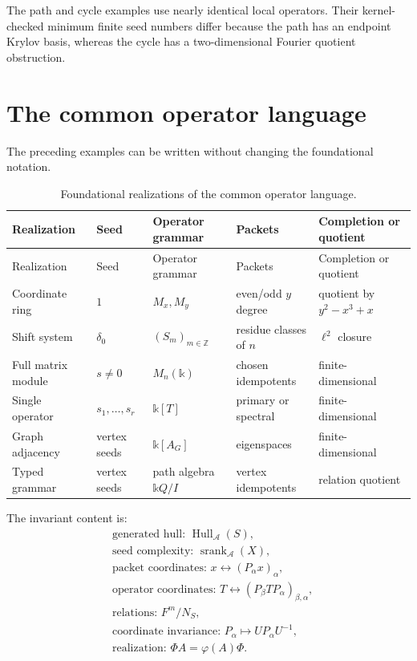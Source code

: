 \documentclass[11pt]{article}
\theoremstyle{definition}
\theoremstyle{remark}
\newcommand{\cA}{\mathcal A}
\newcommand{\Hull}{\operatorname{Hull}}
\newcommand{\srank}{\operatorname{srank}}
\newcommand{\bbk}{\mathbb{k}}
\newcommand{\Z}{\mathbb Z}
\begin{document}
The path and cycle examples use nearly identical local operators.  Their
kernel-checked minimum finite seed numbers differ because the path has an
endpoint Krylov basis, whereas the cycle has a two-dimensional Fourier
quotient obstruction.

\section{The common operator language}

The preceding examples can be written without changing the foundational notation.

\begin{longtable}{L{0.12\textwidth}L{0.13\textwidth}L{0.19\textwidth}L{0.17\textwidth}L{0.16\textwidth}}
\caption{Foundational realizations of the common operator language.}\label{tab:dictionary}\\
\toprule
Realization & Seed & Operator grammar & Packets & Completion or quotient \\
\midrule
\endfirsthead
\toprule
Realization & Seed & Operator grammar & Packets & Completion or quotient \\
\midrule
\endhead
Coordinate ring & $1$ & $M_x,M_y$ & even/odd $y$ degree & quotient by $y^2-x^3+x$ \\
Shift system & $\delta_0$ & $(S_m)_{m\in\Z}$ & residue classes of $n$ & $\ell^2$ closure \\
Full matrix module & $s\ne0$ & $M_n(\bbk)$ & chosen idempotents & finite-dimensional \\
Single operator & $s_1,\ldots,s_r$ & $\bbk[T]$ & primary or spectral & finite-dimensional \\
Graph adjacency & vertex seeds & $\bbk[A_G]$ & eigenspaces & finite-dimensional \\
Typed grammar & vertex seeds & path algebra $\bbk Q/I$ & vertex idempotents & relation quotient \\
\bottomrule
\end{longtable}

The invariant content is:
\[
\boxed{
\begin{aligned}
&\text{generated hull: }\Hull_{\cA}(S),\\
&\text{seed complexity: }\srank_{\cA}(X),\\
&\text{packet coordinates: }x\leftrightarrow(P_{\alpha}x)_{\alpha},\\
&\text{operator coordinates: }T\leftrightarrow(P_{\beta}TP_{\alpha})_{\beta,\alpha},\\
&\text{relations: }F^m/N_S,\\
&\text{coordinate invariance: }P_{\alpha}\mapsto UP_{\alpha}U^{-1},\\
&\text{realization: }\Phi A=\varphi(A)\Phi.
\end{aligned}
}
\]
\end{document}
